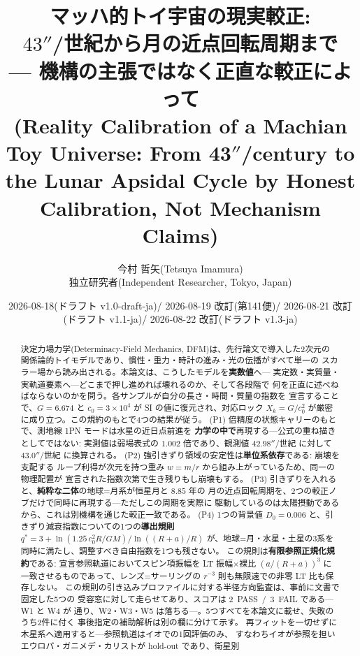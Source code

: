 \documentclass[a4paper,10pt,twocolumn]{ltjsarticle}
\title{マッハ的トイ宇宙の現実較正:\\
$43''$/世紀から月の近点回転周期まで\\
--- 機構の主張ではなく正直な較正によって\\[4pt]
{\large (Reality Calibration of a Machian Toy Universe:
From 43$''$/century to the Lunar Apsidal Cycle
by Honest Calibration, Not Mechanism Claims)}}
\author{今村 哲矢(Tetsuya Imamura)\\
  {\small 独立研究者(Independent Researcher, Tokyo, Japan)}}
\date{2026-08-18(ドラフト v1.0-draft-ja)/ 2026-08-19 改訂(第141便)/
  2026-08-21 改訂(ドラフト v1.1-ja)/ 2026-08-22 改訂(ドラフト v1.3-ja)}
\begin{document}
\maketitle

\begin{abstract}
決定力場力学(Determinacy-Field Mechanics, DFM)は、先行論文で導入した2次元の
関係論的トイモデルであり、慣性・重力・時計の進み・光の伝播がすべて単一の
スカラー場から読み出される。本論文は、こうしたモデルを\textbf{実数値}へ---
実定数・実質量・実軌道要素へ---どこまで押し進めれば壊れるのか、そして各段階で
何を正直に述べねばならないのかを問う。各サンプルが自分の長さ・時間・質量の指数を
宣言することで、$G=6.674$ と $c_0=3\times10^{4}$ が SI の値に復元され、対応ロック
$X_k=G/c_0^{2}$ が厳密に成り立つ。この規約のもとで4つの結果が従う。
(P1) 倍精度の状態キャリーのもとで、測地線 1PN モードは水星の近日点前進を
\textbf{力学の中で}再現する---公式の重ね描きとしてではない: 実測値は弱場表式の
$1.002$ 倍であり、観測値 $42.98''$/世紀 に対して $43.0''$/世紀 に換算される。
(P2) 強引きずり領域の安定性は\textbf{単位系依存}である: 崩壊を支配する
ループ利得が次元を持つ重み $w=m/r$ から組み上がっているため、同一の物理配置が
宣言された指数次第で生き残りもし崩壊もする。
(P3) 引きずりを入れると、\textbf{純粋な二体}の地球=月系が恒星月と $8.85$ 年の
月の近点回転周期を、2つの較正ノブだけで同時に再現する---ただしこの周期を実際に
駆動しているのは太陽摂動であるから、これは別機構を通じた較正一致である。
(P4) 1つの背景値 $D_0=0.006$ と、引きずり減衰指数についての1つの\textbf{導出規則}
$q^{*}=3+\ln(1.25\,c_0^{2}R/GM)/\ln((R+a)/R)$ が、地球=月・水星・土星の3系を
同時に満たし、調整すべき自由指数を1つも残さない。
この規則は\textbf{有限参照正規化規約}である: 宣言参照軌道においてスピン項振幅を
LT 振幅×裸比 $(a/(R+a))^{3}$ に一致させるものであって、レンズ=サーリングの
$r^{-3}$ 則も無限遠での非零 LT 比も保存しない。
この規則の引き込みプロファイルに対する半径方向監査は、事前に文書で固定した5つの
受容窓に対して走らせてあり、スコアは $2$~PASS~/~$3$~FAIL である---W1 と W4 が
通り、W2・W3・W5 は落ちる---。5つすべてを本論文に載せ、失敗のうち2件に付く
事後指定の補助解析は別の欄に分けて示す。
再フィットを一切せずに木星系へ適用すると---参照軌道はイオでの1回評価のみ、
すなわちイオが参照を担いエウロパ・ガニメデ・カリストが hold-out であり、衛星別

\end{abstract}
\end{document}

